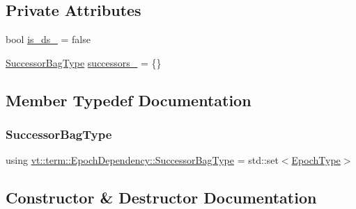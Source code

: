 \subsection*{Private Attributes}
\begin{DoxyCompactItemize}
\item 
bool \hyperlink{structvt_1_1term_1_1_epoch_dependency_af0e5729c264094d1bbc132f429a1219b}{is\+\_\+ds\+\_\+} = false
\item 
\hyperlink{structvt_1_1term_1_1_epoch_dependency_a3f00b47c33158f3241ebbeb0a0cb7b1d}{Successor\+Bag\+Type} \hyperlink{structvt_1_1term_1_1_epoch_dependency_ac9061b05e0c17f67b01754c4c1599770}{successors\+\_\+} = \{\}
\end{DoxyCompactItemize}


\subsection{Member Typedef Documentation}
\mbox{\label{structvt_1_1term_1_1_epoch_dependency_a3f00b47c33158f3241ebbeb0a0cb7b1d}} 
\subsubsection{\texorpdfstring{Successor\+Bag\+Type}{SuccessorBagType}}
{\footnotesize\ttfamily using \hyperlink{structvt_1_1term_1_1_epoch_dependency_a3f00b47c33158f3241ebbeb0a0cb7b1d}{vt\+::term\+::\+Epoch\+Dependency\+::\+Successor\+Bag\+Type} =  std\+::set$<$\hyperlink{namespacevt_a81d11b28122d43bf9834577e4a06440f}{Epoch\+Type}$>$}



\subsection{Constructor \& Destructor Documentation}
\mbox{\label{structvt_1_1term_1_1_epoch_dependency_ac02fe388ef8c1b7097a453e0fcef5bbc}} 
